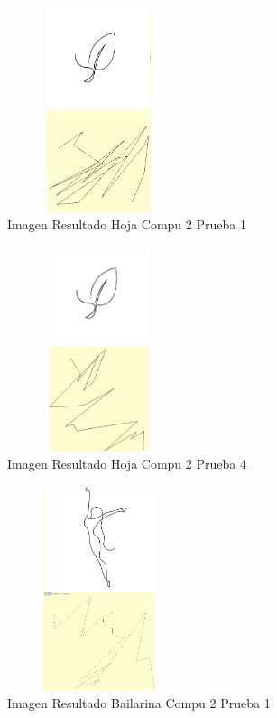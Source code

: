 \documentclass[conference]{IEEEtran}
\begin{document}
\begin{figure}[h]
    \centering
    \includegraphics[width=0.480\textwidth, height=6cm]{unoCompu2Hoja.png} 
    \caption{Imagen Resultado Hoja Compu 2 Prueba 1}
    \label{fig:mi_imagen}
\end{figure}

\begin{figure}[h]
    \centering
    \includegraphics[width=0.480\textwidth, height=6cm]{CuatroHojaCompu2.png} 
    \caption{Imagen Resultado Hoja Compu 2 Prueba 4}
    \label{fig:mi_imagen}
\end{figure}

\begin{figure}[h]
    \centering
    \includegraphics[width=0.480\textwidth, height=6cm]{unoBailarinaCompu2.png} 
    \caption{Imagen Resultado Bailarina Compu 2 Prueba 1}
    \label{fig:mi_imagen}
\end{figure}
\end{document}
